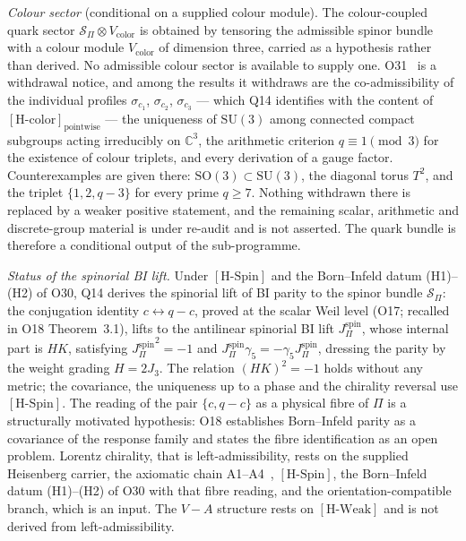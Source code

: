 \documentclass[11pt,a4paper]{article}
\theoremstyle{definition}
\newcommand{\SU}{\mathrm{SU}}
\newcommand{\Sbundle}{\mathcal{S}_\Pi}
\newcommand{\HSpin}{\ensuremath{[\mathrm{H\text{-}Spin}]}}
\newcommand{\HWeak}{\ensuremath{[\mathrm{H\text{-}Weak}]}}
\newcommand{\JBI}{{J^{\mathrm{spin}}_\Pi}}
\begin{document}
      \textit{Colour sector} (conditional on a supplied colour module).
      The colour-coupled quark sector $\Sbundle \otimes V_{\mathrm{color}}$ is obtained by
      tensoring the admissible spinor bundle with a colour module $V_{\mathrm{color}}$ of dimension
      three, carried as a hypothesis rather than derived.
      No admissible colour sector is available to supply one.
      O31~\cite{Beau2026a35} is a withdrawal notice, and among the results it withdraws are the
      co-admissibility of the individual profiles $\sigma_{c_1}$, $\sigma_{c_2}$,
      $\sigma_{c_3}$ --- which Q14 identifies with the content of $[\mathrm{H\text{-}color}]_{\mathrm{pointwise}}$
      --- the
      uniqueness of $\SU(3)$ among connected compact subgroups acting irreducibly on
      $\mathbb{C}^3$, the arithmetic criterion $q \equiv 1 \pmod 3$ for the existence of colour
      triplets, and every derivation of a gauge factor.
      Counterexamples are given there: $\mathrm{SO}(3) \subset \SU(3)$, the diagonal torus $T^2$,
      and the triplet $\{1, 2, q-3\}$ for every prime $q \geq 7$.
      Nothing withdrawn there is replaced by a weaker positive statement, and the remaining scalar,
      arithmetic and discrete-group material is under re-audit and is not asserted.
      The quark bundle is therefore a conditional output of the sub-programme.

      \textit{Status of the spinorial BI lift.}
      Under \HSpin{} and the Born--Infeld datum (H1)--(H2) of O30, Q14 derives the spinorial lift of BI parity to the
      spinor bundle $\Sbundle$: the conjugation identity $c \leftrightarrow q-c$, proved at the scalar Weil level
      (O17; recalled in O18 Theorem~3.1), lifts to the antilinear spinorial BI lift $\JBI$, whose internal part is $HK$,
      satisfying $\JBI^2 = -1$ and $\JBI \gamma_5 = -\gamma_5 \JBI$, dressing the parity by the
      weight grading $H = 2J_3$.
      The relation $(HK)^2 = -1$ holds without any metric; the covariance, the uniqueness up to a phase and the
      chirality reversal use \HSpin{}.
      The reading of the pair $\{c, q-c\}$ as a physical fibre of $\Pi$ is a structurally
      motivated hypothesis: O18 establishes Born--Infeld parity as a covariance of the response family and
      states the fibre identification as an open problem.
      Lorentz chirality, that is left-admissibility, rests on the supplied Heisenberg carrier, the axiomatic chain
      A1--A4~\cite{Beau2026m}, \HSpin{}, the Born--Infeld datum (H1)--(H2) of O30 with that fibre reading, and the
      orientation-compatible branch, which is an input.
      The $V-A$ structure rests on \HWeak{} and is not derived from left-admissibility.
\end{document}
